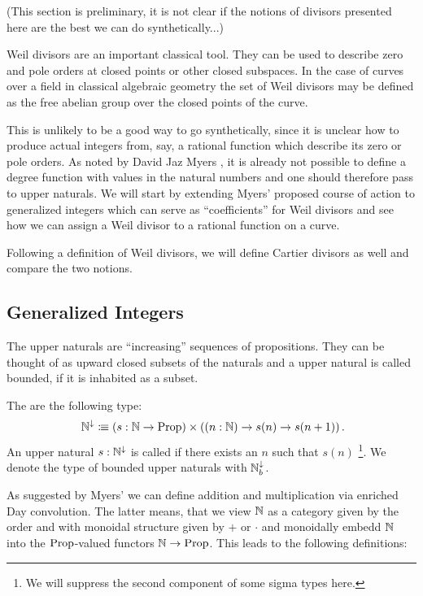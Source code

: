 (This section is preliminary, it is not clear if the notions of divisors presented here are the best we can do synthetically...)


Weil divisors are an important classical tool.
They can be used to describe zero and pole orders at closed points or other closed subspaces. 
In the case of curves over a field in classical algebraic geometry
the set of Weil divisors may be defined as the free abelian group over the closed points of the curve.


This is unlikely to be a good way to go synthetically,
since it is unclear how to produce actual integers from, say, a rational function which describe its zero or pole orders.
As noted by David Jaz Myers \cite{myers-talk2},
it is already not possible to define a degree function with values in the natural numbers and one should therefore pass to upper naturals.
We will start by extending Myers' proposed course of action to generalized integers which can serve as ``coefficients'' for Weil divisors and see how we can assign a Weil divisor to a rational function on a curve.  


Following a definition of Weil divisors, we will define Cartier divisors as well and compare the two notions.


\subsection{Generalized Integers}

The upper naturals are ``increasing'' sequences of propositions.
They can be thought of as upward closed subsets of the naturals
and a upper natural is called bounded, if it is inhabited as a subset.

\begin{definition}
  The \index{$\N^{\downarrow}$} are the following type:
  \[
  \N^{\downarrow}\colonequiv (s:\N\to \Prop)\times \left((n:\N)\to s(n) \to s(n+1)\right)
  \rlap{.}
  \]
  An upper natural $s:\mathbb{N}^{\downarrow}$ is called  if there exists an $n$ such that $s(n)$
  \footnote{We will suppress the second component of some sigma types here.}.
  We denote the type of bounded upper naturals with $\mathbb{N}^{\downarrow}_b$.
\end{definition}

As suggested by Myers' we can define addition and multiplication via enriched Day convolution.
The latter means, that we view $\mathbb{N}$ as a category given by the order and with monoidal structure given by $+$ or $\cdot$ and monoidally embedd $\mathbb{N}$ into the $\mathrm{Prop}$-valued functors $\mathbb{N}\to \mathrm{Prop}$.
This leads to the following definitions:

